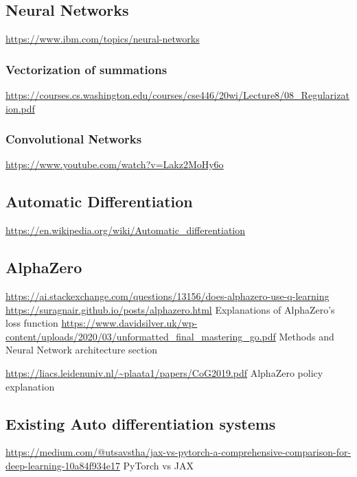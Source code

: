 \documentclass{article}
\begin{document}
    \subsection{Neural Networks}
    \noindent \url{https://www.ibm.com/topics/neural-networks}

    \subsubsection{Vectorization of summations}
    \noindent \url{https://courses.cs.washington.edu/courses/cse446/20wi/Lecture8/08_Regularization.pdf}

    \subsubsection{Convolutional Networks}
    \noindent \url{https://www.youtube.com/watch?v=Lakz2MoHy6o}\\

    \subsection{Automatic Differentiation}
    \noindent \url{https://en.wikipedia.org/wiki/Automatic_differentiation}

    \subsection{AlphaZero}
    \noindent \url{https://ai.stackexchange.com/questions/13156/does-alphazero-use-q-learning}
    \noindent \url{https://suragnair.github.io/posts/alphazero.html}
    Explanations of AlphaZero's loss function
    \noindent \url{https://www.davidsilver.uk/wp-content/uploads/2020/03/unformatted_final_mastering_go.pdf} Methods and Neural Network architecture section

    \noindent \url{https://liacs.leidenuniv.nl/~plaata1/papers/CoG2019.pdf}
    AlphaZero policy explanation

    \subsection{Existing Auto differentiation systems}
    \noindent \url{https://medium.com/@utsavstha/jax-vs-pytorch-a-comprehensive-comparison-for-deep-learning-10a84f934e17}
    PyTorch vs JAX
\end{document}
